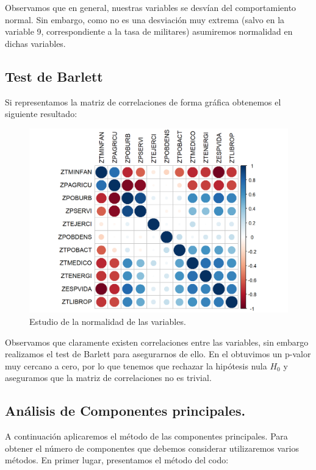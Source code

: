 Observamos que en general, nuestras variables se desvían del comportamiento normal. Sin embargo, como no es una desviación muy extrema (salvo en la variable 9, correspondiente a la tasa de militares) asumiremos normalidad en dichas variables. 

\subsection{Test de Barlett}
Si representamos la matriz de correlaciones de forma gráfica obtenemos el siguiente resultado:
\begin{figure}[H]
    \centering
    \includegraphics[scale=0.8]{correl.png}
    \caption{Estudio de la normalidad de las variables.}
\end{figure}
Observamos que claramente existen correlaciones entre las variables, sin embargo realizamos el test de Barlett para asegurarnos de ello. En el obtuvimos un p-valor muy cercano a cero, por lo que tenemos que rechazar la hipótesis nula $H_0$ y aseguramos que la matriz de correlaciones no es trivial.

\subsection{Análisis de Componentes principales.}

A continuación aplicaremos el método de las componentes principales. Para obtener el número de componentes que debemos considerar utilizaremos varios métodos. En primer lugar, presentamos el método del codo:

